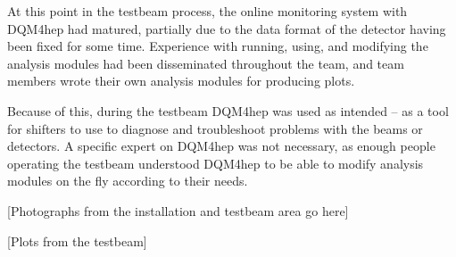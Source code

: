 At this point in the testbeam process, the online monitoring system with DQM4hep had matured, partially due to the data format of the detector having been fixed for some time. Experience with running, using, and modifying the analysis modules had been disseminated throughout the team, and team members wrote their own analysis modules for producing plots.

Because of this, during the testbeam DQM4hep was used as intended -- as a tool for shifters to use to diagnose and troubleshoot problems with the beams or detectors. A specific expert on DQM4hep was not necessary, as enough people operating the testbeam understood DQM4hep to be able to modify analysis modules on the fly according to their needs.


\begin{center}
	[Photographs from the installation and testbeam area go here]
\end{center}

\begin{center}
	[Plots from the testbeam]
\end{center}